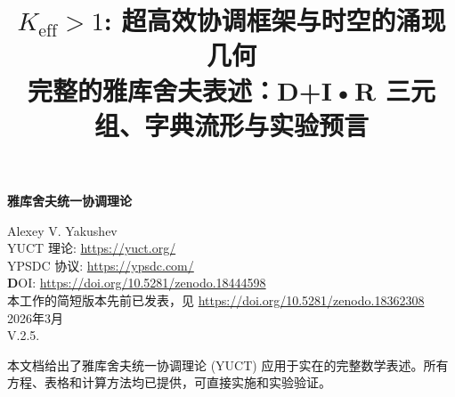 \documentclass[11pt,a4paper]{article}
\title{$K_{\mathrm{eff}} > 1$: 超高效协调框架与时空的涌现几何 \\ 
	\large 完整的雅库舍夫表述：D+I•R 三元组、字典流形与实验预言}
\begin{document}
	\begin{titlepage}
		\begin{center}
			\vspace*{3cm}
			\Huge\textbf{雅库舍夫统一协调理论\\
			}
			
			\vspace{2cm}
			\Large
			Alexey V. Yakushev\\
			\vspace{2cm}
			YUCT 理论: \url{https://yuct.org/}\\
			YPSDC 协议: \url{https://ypsdc.com/}\\
			
			\vspace{2cm}
			\textbf DOI: \url{https://doi.org/10.5281/zenodo.18444598}\\
			
			\vspace{1cm}
			\large 
			本工作的简短版本先前已发表，见 \url{https://doi.org/10.5281/zenodo.18362308}\\
			\vspace{1cm}
			2026年3月 \\ \large V.2.5.
			
			\vfill
			\normalsize
			本文档给出了雅库舍夫统一协调理论 (YUCT) 应用于实在的完整数学表述。所有方程、表格和计算方法均已提供，可直接实施和实验验证。
		\end{center}
	\end{titlepage}
	
	\maketitle
	
\end{document}
